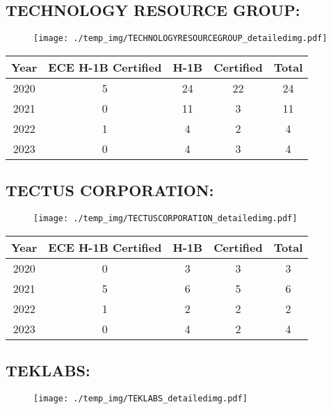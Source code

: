 \documentclass{article}%
\begin{document}
%
\newpage%
\subsection{TECHNOLOGY RESOURCE GROUP:}%
\label{subsec:TECHNOLOGYRESOURCEGROUP}%
\label{TECHNOLOGYRESOURCEGROUPdetailed}%


\begin{figure}[htbp]%
\centering%
\texttt{[image: ./temp\_img/TECHNOLOGYRESOURCEGROUP\_detailedimg.pdf]}%
\end{figure}

%
\begin{longtable}{c|c|c|c|c}%
\hline%
Year&ECE H{-}1B Certified&H{-}1B&Certified&Total\\%
\hline%
2020&5&24&22&24\\%
\hline%
2021&0&11&3&11\\%
\hline%
2022&1&4&2&4\\%
\hline%
2023&0&4&3&4\\%
\hline%
\end{longtable}

%
\newpage%
\subsection{TECTUS CORPORATION:}%
\label{subsec:TECTUSCORPORATION}%
\label{TECTUSCORPORATIONdetailed}%


\begin{figure}[htbp]%
\centering%
\texttt{[image: ./temp\_img/TECTUSCORPORATION\_detailedimg.pdf]}%
\end{figure}

%
\begin{longtable}{c|c|c|c|c}%
\hline%
Year&ECE H{-}1B Certified&H{-}1B&Certified&Total\\%
\hline%
2020&0&3&3&3\\%
\hline%
2021&5&6&5&6\\%
\hline%
2022&1&2&2&2\\%
\hline%
2023&0&4&2&4\\%
\hline%
\end{longtable}

%
\newpage%
\subsection{TEKLABS:}%
\label{subsec:TEKLABS}%
\label{TEKLABSdetailed}%


\begin{figure}[htbp]%
\centering%
\texttt{[image: ./temp\_img/TEKLABS\_detailedimg.pdf]}%
\end{figure}
\end{document}
